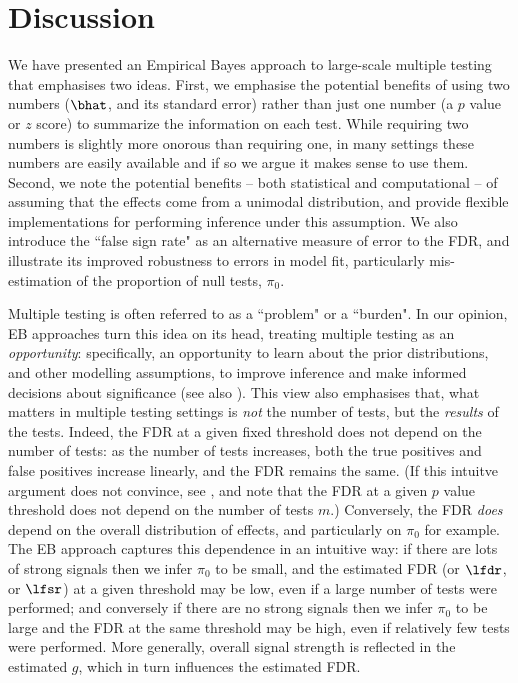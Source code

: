 \section*{Discussion}

We have presented an Empirical Bayes approach to large-scale multiple testing that emphasises two ideas.
First, we emphasise the potential benefits of using two numbers ($\bhat$, and its standard error)
rather than just one number (a $p$ value or $z$ score)  to summarize the information on each test.
While requiring two numbers is slightly more onorous than requiring one, in many settings these
numbers are easily available and if so we argue it makes sense to use them.
Second, we note the potential benefits -- both statistical and computational -- of assuming that the effects come from a unimodal distribution, and provide
flexible implementations for performing inference under this assumption. We also introduce the ``false sign rate" as
an alternative measure of error to the FDR, and illustrate its improved robustness to errors in model fit, particularly mis-estimation
of the proportion of null tests, $\pi_0$.

Multiple testing is often referred to as a ``problem" or a ``burden". In our opinion, EB approaches turn this idea on its head,
treating multiple testing as an {\it opportunity}: specifically, an opportunity to learn about the prior distributions, and other modelling assumptions,
to improve inference and make informed decisions about significance (see also \cite{greenland1991empirical}). This view
also emphasises that, what matters in multiple testing settings is {\it not} the number of tests, but the {\it results} of the tests.
Indeed, the FDR at a given fixed threshold does not depend on the number of tests: as the number of tests increases, both the true positives and false positives increase linearly,
and the FDR remains the same. (If this intuitve argument does not convince, see \cite{storey.03}, and note that the FDR at a given $p$ value threshold does not depend on the number of tests $m$.) Conversely, the FDR {\it does} depend on the overall distribution of effects, and particularly on $\pi_0$ for example. 
The EB approach captures this dependence in an intuitive way:
if there are lots of strong signals then we infer $\pi_0$ to be small, and the estimated FDR (or $\lfdr$, or $\lfsr$) at a given threshold may be low, even if a large number of tests were performed; and conversely
if there are no strong signals then we infer $\pi_0$ to be large and the FDR at the same threshold may be high, even if relatively few tests were performed. 
More generally, overall signal strength is reflected in the estimated $g$, which in turn influences the estimated FDR.

